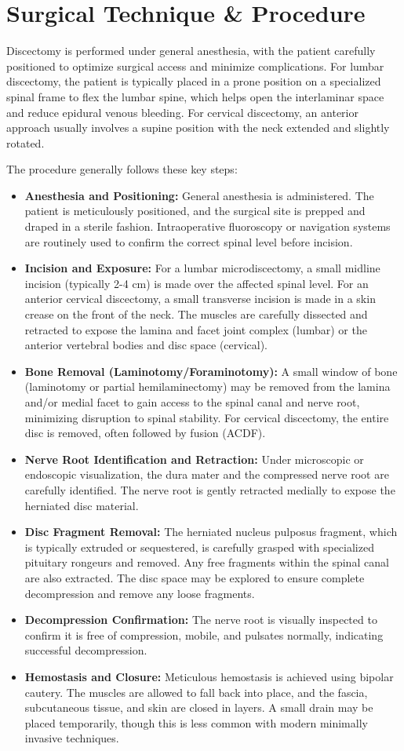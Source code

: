 \section*{Surgical Technique \& Procedure}
Discectomy is performed under general anesthesia, with the patient carefully positioned to optimize surgical access and minimize complications. For lumbar discectomy, the patient is typically placed in a prone position on a specialized spinal frame to flex the lumbar spine, which helps open the interlaminar space and reduce epidural venous bleeding. For cervical discectomy, an anterior approach usually involves a supine position with the neck extended and slightly rotated.

The procedure generally follows these key steps:
\begin{itemize}
  \item \textbf{Anesthesia and Positioning:} General anesthesia is administered. The patient is meticulously positioned, and the surgical site is prepped and draped in a sterile fashion. Intraoperative fluoroscopy or navigation systems are routinely used to confirm the correct spinal level before incision.
  \item \textbf{Incision and Exposure:} For a lumbar microdiscectomy, a small midline incision (typically 2-4 cm) is made over the affected spinal level. For an anterior cervical discectomy, a small transverse incision is made in a skin crease on the front of the neck. The muscles are carefully dissected and retracted to expose the lamina and facet joint complex (lumbar) or the anterior vertebral bodies and disc space (cervical).
  \item \textbf{Bone Removal (Laminotomy/Foraminotomy):} A small window of bone (laminotomy or partial hemilaminectomy) may be removed from the lamina and/or medial facet to gain access to the spinal canal and nerve root, minimizing disruption to spinal stability. For cervical discectomy, the entire disc is removed, often followed by fusion (ACDF).
  \item \textbf{Nerve Root Identification and Retraction:} Under microscopic or endoscopic visualization, the dura mater and the compressed nerve root are carefully identified. The nerve root is gently retracted medially to expose the herniated disc material.
  \item \textbf{Disc Fragment Removal:} The herniated nucleus pulposus fragment, which is typically extruded or sequestered, is carefully grasped with specialized pituitary rongeurs and removed. Any free fragments within the spinal canal are also extracted. The disc space may be explored to ensure complete decompression and remove any loose fragments.
  \item \textbf{Decompression Confirmation:} The nerve root is visually inspected to confirm it is free of compression, mobile, and pulsates normally, indicating successful decompression.
  \item \textbf{Hemostasis and Closure:} Meticulous hemostasis is achieved using bipolar cautery. The muscles are allowed to fall back into place, and the fascia, subcutaneous tissue, and skin are closed in layers. A small drain may be placed temporarily, though this is less common with modern minimally invasive techniques.
\end{itemize}
